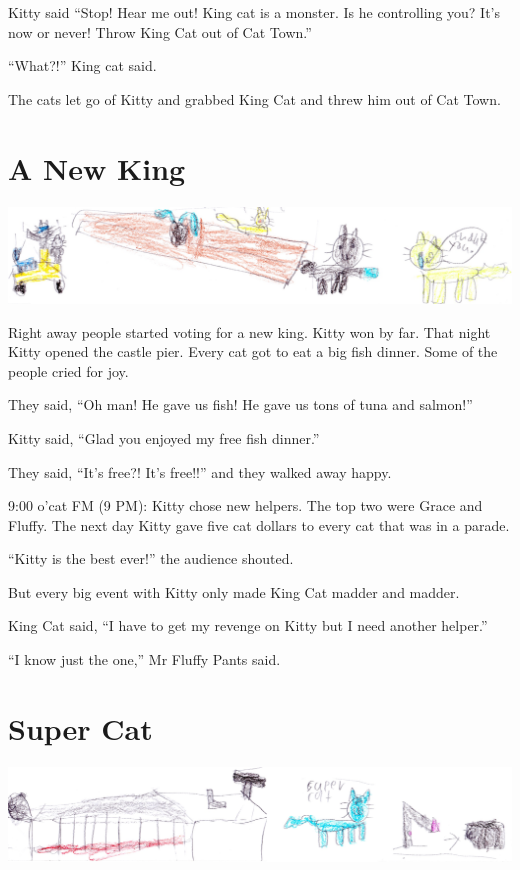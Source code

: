 \documentclass[]{krantz}
\begin{document}
Kitty said ``Stop! Hear me out! King cat is a monster. Is he controlling
you? It's now or never! Throw King Cat out of Cat Town.''

``What?!'' King cat said.

The cats let go of Kitty and grabbed King Cat and threw him out of Cat
Town.

\hypertarget{a-new-king}{%
\chapter{A New King}\label{a-new-king}}

\includegraphics{img/thankyou.jpg}

Right away people started voting for a new king. Kitty won by far. That
night Kitty opened the castle pier. Every cat got to eat a big fish
dinner. Some of the people cried for joy.

They said, ``Oh man! He gave us fish! He gave us tons of tuna and
salmon!''

Kitty said, ``Glad you enjoyed my free fish dinner.''

They said, ``It's free?! It's free!!'' and they walked away happy.

9:00 o'cat FM (9 PM): Kitty chose new helpers. The top two were Grace
and Fluffy. The next day Kitty gave five cat dollars to every cat that
was in a parade.

``Kitty is the best ever!'' the audience shouted.

But every big event with Kitty only made King Cat madder and madder.

King Cat said, ``I have to get my revenge on Kitty but I need another
helper.''

``I know just the one,'' Mr Fluffy Pants said.

\hypertarget{super-cat}{%
\chapter{Super Cat}\label{super-cat}}

\includegraphics{img/supercat.jpg}
\end{document}
